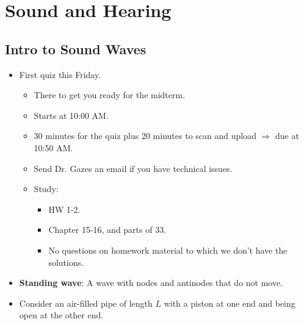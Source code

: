\documentclass[../notes.tex]{subfiles}
\begin{document}
\chapter{Sound and Hearing}
\section{Intro to Sound Waves}
\begin{itemize}
    \item {}First quiz this Friday.
    \begin{itemize}
        \item There to get you ready for the midterm.
        \item Starts at 10:00 AM.
        \item 30 minutes for the quiz plus 20 minutes to scan and upload $\Rightarrow$ due at 10:50 AM.
        \item Send Dr. Gazes an email if you have technical issues.
        \item Study:
        \begin{itemize}
            \item HW 1-2.
            \item Chapter 15-16, and parts of 33.
            \item No questions on homework material to which we don't have the solutions.
        \end{itemize}
    \end{itemize}
    \item \textbf{Standing wave}: A wave with nodes and antinodes that do not move.
    \item Consider an air-filled pipe of length $L$ with a piston at one end and being open at the other end.
    \begin{figure}[h!]
        \centering
\end{figure}
\end{itemize}
\end{document}
